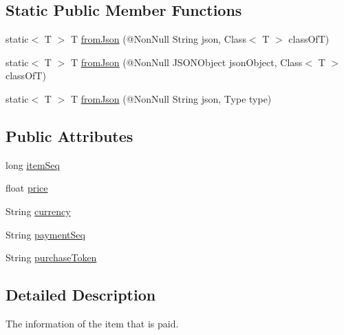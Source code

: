 \subsection*{Static Public Member Functions}
\begin{DoxyCompactItemize}
\item 
static$<$ T $>$ T \hyperlink{classcom_1_1toast_1_1android_1_1gamebase_1_1base_1_1_value_object_ae6655c88c20a9a8406dc11b46250ac7b}{from\+Json} (@Non\+Null String json, Class$<$ T $>$ class\+OfT)
\item 
static$<$ T $>$ T \hyperlink{classcom_1_1toast_1_1android_1_1gamebase_1_1base_1_1_value_object_ab83c4196ee2e3f11553bbe0f04dc2101}{from\+Json} (@Non\+Null J\+S\+O\+N\+Object json\+Object, Class$<$ T $>$ class\+OfT)
\item 
static$<$ T $>$ T \hyperlink{classcom_1_1toast_1_1android_1_1gamebase_1_1base_1_1_value_object_aa901d97d495150b54bcb80c05672f58a}{from\+Json} (@Non\+Null String json, Type type)
\end{DoxyCompactItemize}
\subsection*{Public Attributes}
\begin{DoxyCompactItemize}
\item 
long \hyperlink{classcom_1_1toast_1_1android_1_1gamebase_1_1base_1_1purchase_1_1_purchasable_receipt_ae238e7a4dbb904519cb83075b2ac046f}{item\+Seq}
\item 
float \hyperlink{classcom_1_1toast_1_1android_1_1gamebase_1_1base_1_1purchase_1_1_purchasable_receipt_a500426aec97889b7572f25ae45c06a8d}{price}
\item 
String \hyperlink{classcom_1_1toast_1_1android_1_1gamebase_1_1base_1_1purchase_1_1_purchasable_receipt_a21ef1fb8b40391856719451100a37a00}{currency}
\item 
String \hyperlink{classcom_1_1toast_1_1android_1_1gamebase_1_1base_1_1purchase_1_1_purchasable_receipt_aa036458576ad15900867e41ef43fc1df}{payment\+Seq}
\item 
String \hyperlink{classcom_1_1toast_1_1android_1_1gamebase_1_1base_1_1purchase_1_1_purchasable_receipt_a62d63205b7e00bdaf4601675392d24ae}{purchase\+Token}
\end{DoxyCompactItemize}


\subsection{Detailed Description}
The information of the item that is paid. 

